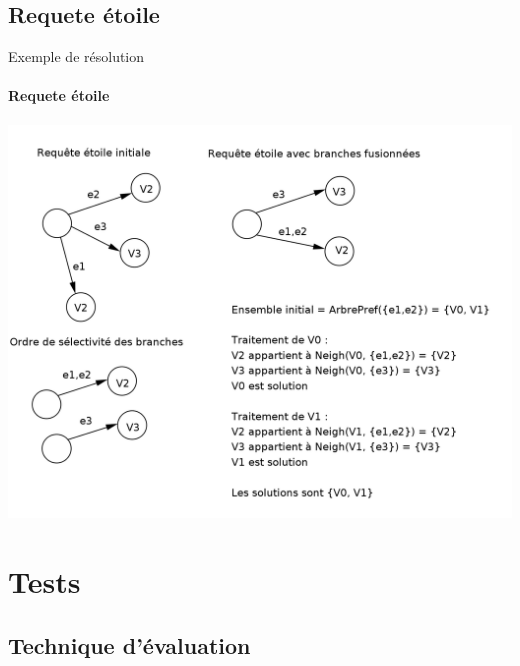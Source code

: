 \documentclass[french]{beamer}
\begin{document}
\subsection[Requete étoile]{Requete étoile}

\begin{frame}{Exemple de résolution}
  \framesubtitle{Requete étoile}

  \includegraphics[scale=0.7]{images/query.png}

\end{frame}

\section[Tests]{Tests}

\subsection[Technique d'évaluation]{Technique d'évaluation}
\end{document}
